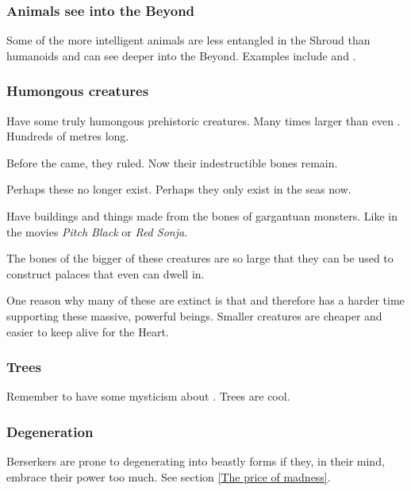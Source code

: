 \subsubsection{Animals see into the Beyond}
Some of the more intelligent animals are less entangled in the Shroud than humanoids and can see deeper into the Beyond. 
Examples include  and .  





\subsubsection{Humongous creatures}
Have some truly humongous prehistoric creatures. 
Many times larger than even \dragons. 
Hundreds of metres long. 

Before the \ophidians{} came, they ruled. 
Now their indestructible bones remain. 

Perhaps these no longer exist. 
Perhaps they only exist in the seas now. 

Have buildings and things made from the bones of gargantuan monsters. 
Like in the movies \emph{Pitch Black} or \emph{Red Sonja}. 

The bones of the bigger of these creatures are so large that they can be used to construct palaces that even \dragons{} can dwell in. 

One reason why many of these are extinct is that  and therefore has a harder time supporting these massive, powerful beings. 
Smaller creatures are cheaper and easier to keep alive for the Heart. 





\subsubsection{Trees}
Remember to have some mysticism about . Trees are cool. 





\subsubsection{Degeneration}
Berserkers are prone to degenerating into beastly forms if they, in their mind, embrace their \Wylde{} power too much. See section \ref{The price of madness}. 









